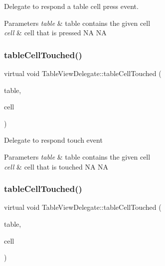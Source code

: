 Delegate to respond a table cell press event.


\begin{DoxyParams}{Parameters}
{\em table} & table contains the given cell \\
\hline
{\em cell} & cell that is pressed  NA  NA \\
\hline
\end{DoxyParams}
\mbox{\label{classTableViewDelegate_a943c7dd2eb325e7624066b915e59a9fc}} 
\subsubsection{\texorpdfstring{table\+Cell\+Touched()}{tableCellTouched()}\hspace{0.1cm}{\footnotesize\ttfamily [1/2]}}
{\footnotesize\ttfamily virtual void Table\+View\+Delegate\+::table\+Cell\+Touched (\begin{DoxyParamCaption}\item[{\hyperlink{classTableView}{Table\+View} $\ast$}]{table,  }\item[{\hyperlink{classTableViewCell}{Table\+View\+Cell} $\ast$}]{cell }\end{DoxyParamCaption})\hspace{0.3cm}{\ttfamily [pure virtual]}}

Delegate to respond touch event


\begin{DoxyParams}{Parameters}
{\em table} & table contains the given cell \\
\hline
{\em cell} & cell that is touched  NA  NA \\
\hline
\end{DoxyParams}
\mbox{\label{classTableViewDelegate_a943c7dd2eb325e7624066b915e59a9fc}} 
\subsubsection{\texorpdfstring{table\+Cell\+Touched()}{tableCellTouched()}\hspace{0.1cm}{\footnotesize\ttfamily [2/2]}}
{\footnotesize\ttfamily virtual void Table\+View\+Delegate\+::table\+Cell\+Touched (\begin{DoxyParamCaption}\item[{\hyperlink{classTableView}{Table\+View} $\ast$}]{table,  }\item[{\hyperlink{classTableViewCell}{Table\+View\+Cell} $\ast$}]{cell }\end{DoxyParamCaption})\hspace{0.3cm}{\ttfamily [pure virtual]}}

